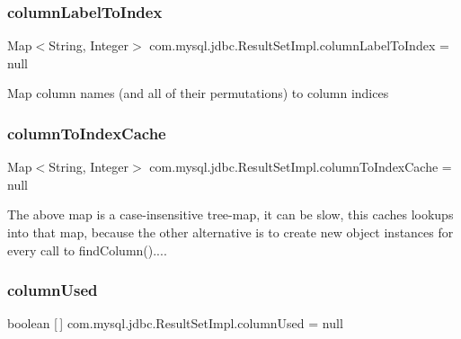 \subsubsection{\texorpdfstring{column\+Label\+To\+Index}{columnLabelToIndex}}
{\footnotesize\ttfamily Map$<$String, Integer$>$ com.\+mysql.\+jdbc.\+Result\+Set\+Impl.\+column\+Label\+To\+Index = null\hspace{0.3cm}{\ttfamily [protected]}}

Map column names (and all of their permutations) to column indices \mbox{\label{classcom_1_1mysql_1_1jdbc_1_1_result_set_impl_a32a373e5b92a70b358e1c65f63620d56}} 
\subsubsection{\texorpdfstring{column\+To\+Index\+Cache}{columnToIndexCache}}
{\footnotesize\ttfamily Map$<$String, Integer$>$ com.\+mysql.\+jdbc.\+Result\+Set\+Impl.\+column\+To\+Index\+Cache = null\hspace{0.3cm}{\ttfamily [protected]}}

The above map is a case-\/insensitive tree-\/map, it can be slow, this caches lookups into that map, because the other alternative is to create new object instances for every call to find\+Column().... \mbox{\label{classcom_1_1mysql_1_1jdbc_1_1_result_set_impl_add36b8fd2a3b4b678158051f1e7af285}} 
\subsubsection{\texorpdfstring{column\+Used}{columnUsed}}
{\footnotesize\ttfamily boolean \mbox{[}$\,$\mbox{]} com.\+mysql.\+jdbc.\+Result\+Set\+Impl.\+column\+Used = null\hspace{0.3cm}{\ttfamily [protected]}}

